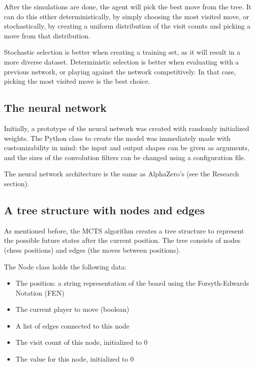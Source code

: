 \documentclass{article}
\begin{document}
After the simulations are done, the agent will pick the best move from the tree. 
It can do this either deterministically, by simply choosing the most visited move, or stochastically,
by creating a uniform distribution of the visit counts and picking a move from that distribution.

Stochastic selection is better when creating a training set, as it will result in a more diverse dataset.
Deterministic selection is better when evaluating with a previous network, or playing against the network competitively. 
In that case, picking the most visited move is the best choice.

\subsection{The neural network}

Initially, a prototype of the neural network was created with randomly initialized weights.
The Python class to create the model was immediately made with customizability in mind: 
the input and output shapes can be given as arguments, and the sizes of the convolution filters 
can be changed using a configuration file.

The neural network architecture is the same as AlphaZero's (see the Research section). 

\subsection{A tree structure with nodes and edges}

As mentioned before, the MCTS algorithm creates a tree structure to represent 
the possible future states after the current position. The tree consists of nodes (chess positions) 
and edges (the moves between positions).

The Node class holds the following data:

\begin{itemize}
    \item The position: a string representation of the board using the Forsyth-Edwards Notation (FEN) \cite{ForsythEdwardsNotation2022}
    \item The current player to move (boolean)
    \item A list of edges connected to this node
    \item The visit count of this node, initialized to 0
    \item The value for this node, initialized to 0
\end{itemize}
\end{document}
